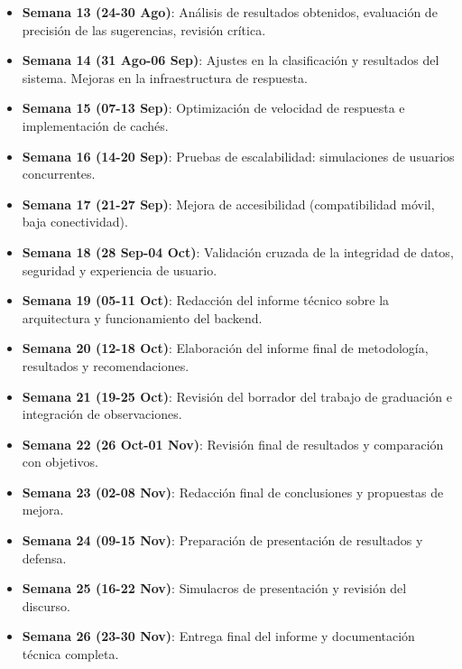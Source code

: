 \begin{itemize}
  \item \textbf{Semana 13 (24-30 Ago)}: Análisis de resultados obtenidos, evaluación de precisión de las sugerencias, revisión crítica.
  \item \textbf{Semana 14 (31 Ago-06 Sep)}: Ajustes en la clasificación y resultados del sistema. Mejoras en la infraestructura de respuesta.
  \item \textbf{Semana 15 (07-13 Sep)}: Optimización de velocidad de respuesta e implementación de cachés.
  \item \textbf{Semana 16 (14-20 Sep)}: Pruebas de escalabilidad: simulaciones de usuarios concurrentes.
  \item \textbf{Semana 17 (21-27 Sep)}: Mejora de accesibilidad (compatibilidad móvil, baja conectividad).
  \item \textbf{Semana 18 (28 Sep-04 Oct)}: Validación cruzada de la integridad de datos, seguridad y experiencia de usuario.
  \item \textbf{Semana 19 (05-11 Oct)}: Redacción del informe técnico sobre la arquitectura y funcionamiento del backend.
  \item \textbf{Semana 20 (12-18 Oct)}: Elaboración del informe final de metodología, resultados y recomendaciones.
  \item \textbf{Semana 21 (19-25 Oct)}: Revisión del borrador del trabajo de graduación e integración de observaciones.
  \item \textbf{Semana 22 (26 Oct-01 Nov)}: Revisión final de resultados y comparación con objetivos.
  \item \textbf{Semana 23 (02-08 Nov)}: Redacción final de conclusiones y propuestas de mejora.
  \item \textbf{Semana 24 (09-15 Nov)}: Preparación de presentación de resultados y defensa.
  \item \textbf{Semana 25 (16-22 Nov)}: Simulacros de presentación y revisión del discurso.
  \item \textbf{Semana 26 (23-30 Nov)}: Entrega final del informe y documentación técnica completa.
\end{itemize}
